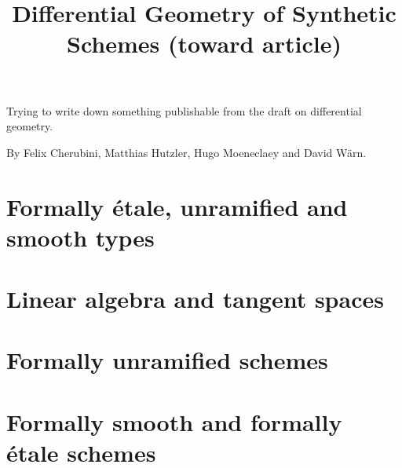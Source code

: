 \documentclass{../util/zariski}
\title{Differential Geometry of Synthetic Schemes (toward article)}
\begin{document}
\maketitle

Trying to write down something publishable from the draft on differential geometry.

By Felix Cherubini, Matthias Hutzler, Hugo Moeneclaey and David Wärn.

\tableofcontents

\section{Formally étale, unramified and smooth types}


\section{Linear algebra and tangent spaces}


\section{Formally unramified schemes}


\section{Formally smooth and formally étale schemes}



\printindex

\printbibliography
\end{document}

